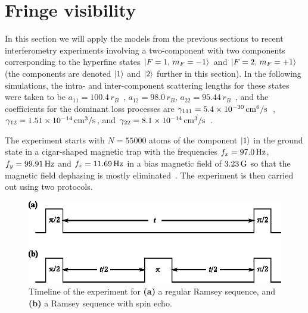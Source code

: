 \section{Fringe visibility}
\label{sec:bec-noise:visibility}

In this section we will apply the models from the previous sections to recent interferometry experiments involving a two-component \Rb{}  with two components corresponding to the hyperfine states ${\mbox{\ensuremath{\left\vert F=1,\, m_F=-1 \right\rangle}}}$ and ${\mbox{\ensuremath{\left\vert F=2,\, m_F=+1 \right\rangle}}}$~\cite{Egorov2011} (the components are denoted $\mbox{\ensuremath{\left\vert 1 \right\rangle}}$ and $\mbox{\ensuremath{\left\vert 2 \right\rangle}}$ further in this section).
In the following simulations, the intra- and inter-component scattering lengths for these states were taken to be $a_{11} = 100.4\,r_B$~\cite{Widera2006,Mertes2007}, $a_{12} = 98.0\,r_B$, $a_{22} = 95.44\,r_B$~\cite{Egorov2013}, and the coefficients for the dominant loss processes are $\gamma_{111} = 5.4 \times 10^{-30} \mbox{\ensuremath{\,\mathrm{cm^6/s}}}$~\cite{Mertes2007}, $\gamma_{12} = 1.51 \times 10^{-14}\mbox{\ensuremath{\,\mathrm{cm^3/s}}}$, and $\gamma_{22} = 8.1 \times 10^{-14} \mbox{\ensuremath{\,\mathrm{cm^3/s}}}$~\cite{Egorov2013}.

The experiment starts with $N = 55000$ atoms of the component $\mbox{\ensuremath{\left\vert 1 \right\rangle}}$ in the ground state in a cigar-shaped magnetic trap with the frequencies $f_x = 97.0\mbox{\ensuremath{\,\mathrm{Hz}}}$, $f_y = 99.91\mbox{\ensuremath{\,\mathrm{Hz}}}$ and $f_z = 11.69\mbox{\ensuremath{\,\mathrm{Hz}}}$ in a bias magnetic field of $3.23\mbox{\ensuremath{\,\mathrm{G}}}$ so that the magnetic field dephasing is mostly eliminated~\cite{Hall1998}.
The experiment is then carried out using two protocols.

\begin{figure}
    \centerline{\includegraphics{figures_precreated/sequences.eps}}
    \caption[Timeline of Ramsey and spin echo experimental sequences]{
    Timeline of the experiment for \textbf{(a)} a regular Ramsey sequence, and \textbf{(b)} a Ramsey sequence with spin echo.}%
    \label{fig:bec-noise:visibility:sequences}
\end{figure}

